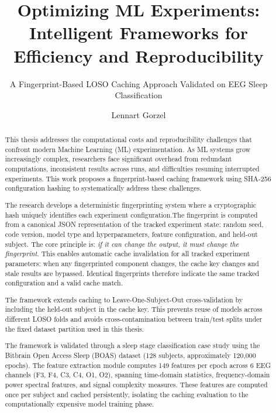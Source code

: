 \documentclass{imc-inf} %
\title{Optimizing ML Experiments: Intelligent Frameworks for Efficiency and Reproducibility}
\subtitle{A Fingerprint-Based LOSO Caching Approach Validated on EEG Sleep Classification}
\author{Lennart Gorzel}
\begin{document}
\frontmatter
\maketitle

\begin{declarations}
\end{declarations}


\begin{abstract}
This thesis addresses the computational costs and reproducibility challenges 
that confront modern Machine Learning (ML) experimentation. As ML systems grow 
increasingly complex, researchers face significant overhead from redundant 
computations, inconsistent results across runs, and difficulties resuming 
interrupted experiments. This work proposes a fingerprint-based caching 
framework using SHA-256 configuration hashing to systematically address these 
challenges.

The research develops a deterministic fingerprinting system where a cryptographic 
hash uniquely identifies each experiment configuration.The fingerprint is computed from a canonical JSON representation of the tracked experiment state: random seed, code version, model type and hyperparameters, feature configuration, and held-out subject. The core principle is: 
\textit{if it can change the output, it must change the fingerprint}. This enables automatic cache invalidation for all tracked experiment parameters: when any fingerprinted component changes, the cache key changes and stale results are bypassed. Identical fingerprints therefore indicate the same tracked configuration and a valid cache match.

The framework extends caching to Leave-One-Subject-Out cross-validation by including the held-out subject in the cache key. This prevents reuse of models across different LOSO folds and avoids cross-contamination between train/test splits under the fixed dataset partition used in this thesis.

The framework is validated through a sleep stage classification case study using the Bitbrain Open Access Sleep (BOAS) dataset (128 subjects, approximately 120,000 epochs). 
The feature extraction module computes 149 features per epoch across 6 EEG channels (F3, F4, C3, C4, O1, O2), spanning time-domain statistics, frequency-domain power spectral features, and signal complexity measures. These features are computed once per subject and cached persistently, isolating the caching evaluation to the computationally expensive model training phase.


\end{abstract}
\end{document}
